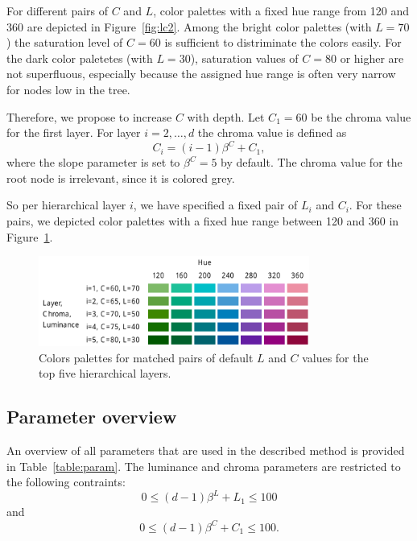 \documentclass[journal]{vgtc}                %
\begin{document}
For different pairs of $C$ and $L$, color palettes with a fixed hue range from 120 and 360 are depicted in Figure~\ref{fig:lc2}. Among the bright color palettes (with $L=70$) the saturation level of $C=60$ is sufficient to distriminate the colors easily. For the dark color paletetes (with $L=30$), saturation values of $C=80$ or higher are not superfluous, especially because the assigned hue range is often very narrow for nodes low in the tree.

Therefore, we propose to increase $C$ with depth. Let $C_1=60$ be the chroma value for the first layer. For layer $i=2,\ldots, d$ the chroma value is defined as
\begin{equation}
C_i=(i-1)\beta^C + C_1,
\end{equation}
where the slope parameter is set to $\beta^C=5$ by default. The chroma value for the root node is irrelevant, since it is colored grey.

So per hierarchical layer $i$, we have specified a fixed pair of $L_i$ and $C_i$. For these pairs, we depicted color palettes with a fixed hue range between 120 and 360 in Figure~\ref{fig:lc3}.

\begin{figure}[htb]
  \centering
  \includegraphics[width=3.5in]{LC3.pdf}
  \caption{Colors palettes for matched pairs of default $L$ and $C$ values for the top five hierarchical layers.}\label{fig:lc3}
\end{figure}



\subsection{Parameter overview}

An overview of all parameters that are used in the described method is provided in Table~\ref{table:param}. The luminance and chroma parameters are restricted to the following contraints:
\begin{equation}
0 \leq (d-1)\beta^L + L_1 \leq 100
\end{equation}
and 
\begin{equation}
0 \leq (d-1)\beta^C + C_1 \leq 100.
\end{equation}
\end{document}
